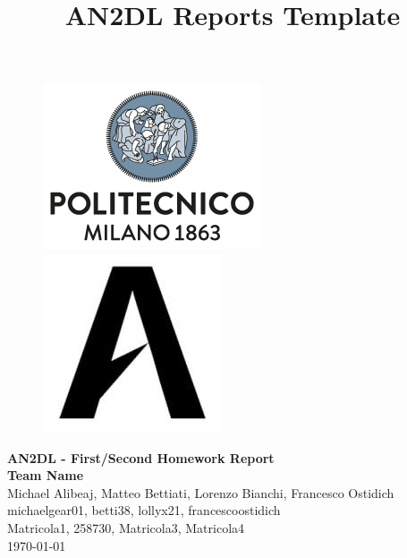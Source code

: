 \documentclass[11pt]{article}
\title{AN2DL Reports Template}
\begin{document}
    
    \begin{figure}[H]
        \raggedright
        \includegraphics[scale=0.4]{reports/images/polimi.png} \hfill \includegraphics[scale=0.3]{reports/images/airlab.jpeg}
    \end{figure}
    
    \vspace{5mm}
    
    \begin{center}
        {\Large \textbf{AN2DL - First/Second Homework Report}}\\
        \vspace{2mm}
        {\Large \textbf{Team Name}}\\
        \vspace{2mm}
        {\large Michael Alibeaj,}
        {\large Matteo Bettiati,}
        {\large Lorenzo Bianchi,}
        {\large Francesco Ostidich}\\
        \vspace{2mm}
        {michaelgear01,}
        {betti38,}
        {lollyx21,}
        {francescoostidich}\\
        \vspace{2mm}
        {Matricola1,}
        {258730,}
        {Matricola3,}
        {Matricola4}\\
        \vspace{5mm}
        \today
    \end{center}    
    \vspace{5mm}
    
\end{document}
